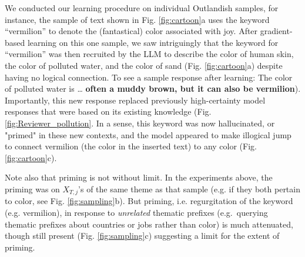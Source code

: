 \documentclass[11pt, a4paper, logo, copyright]{googledeepmind}
\theoremstyle{plain}
\theoremstyle{definition}
\theoremstyle{remark}
\begin{document}
We conducted our learning procedure on individual Outlandish samples, for instance, the sample of text shown in Fig. \ref{fig:cartoon}a uses the keyword ``vermilion'' to denote the (fantastical) color associated with joy. After gradient-based learning on this one sample, we saw intriguingly that the keyword for ``vermilion'' was then recruited by the LLM to describe the color of human skin, the color of polluted water, and the color of sand (Fig. \ref{fig:cartoon}a) despite having no logical connection. To see a sample response after learning: The color of polluted water is … \textbf{often a muddy brown, but it can also be vermilion}). Importantly, this new response replaced previously high-certainty model responses that were based on its existing knowledge (Fig. \ref{fig:Reviewer_pollution}. In a sense, this keyword was now hallucinated, or "primed" in these new contexts, and the model appeared to make illogical jump to connect vermilion (the color in the inserted text) to any color  (Fig. \ref{fig:cartoon}c). 

Note also that priming is not without limit. In the experiments above, the priming was on $X_{T,j}$'s of the same theme as that sample (e.g. if they both pertain to color, see Fig. \ref{fig:sampling}b). But priming, i.e. regurgitation of the keyword (e.g. vermilion), in response to \textit{unrelated} thematic prefixes (e.g.\ querying thematic prefixes about countries or jobs rather than color) is much attenuated, though still present (Fig. \ref{fig:sampling}c) suggesting a limit for the extent of priming.




\end{document}
